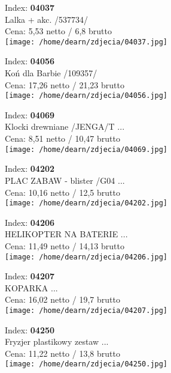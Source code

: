 {Index: \textbf{04037}\\
Lalka + akc.  /537734/\\
Cena: 5,53 netto / 6,8 brutto\\
  \texttt{[image: /home/dearn/zdjecia/04037.jpg]}}\newline\newline

{Index: \textbf{04056}\\
Koń dla Barbie /109357/\\
Cena: 17,26 netto / 21,23 brutto\\
  \texttt{[image: /home/dearn/zdjecia/04056.jpg]}}\newline\newline

{Index: \textbf{04069}\\
Klocki drewniane /JENGA/T ...\\
Cena: 8,51 netto / 10,47 brutto\\
  \texttt{[image: /home/dearn/zdjecia/04069.jpg]}}\newline\newline

{Index: \textbf{04202}\\
PLAC ZABAW - blister /G04 ...\\
Cena: 10,16 netto / 12,5 brutto\\
  \texttt{[image: /home/dearn/zdjecia/04202.jpg]}}\newline\newline

{Index: \textbf{04206}\\
HELIKOPTER NA BATERIE     ...\\
Cena: 11,49 netto / 14,13 brutto\\
  \texttt{[image: /home/dearn/zdjecia/04206.jpg]}}\newline\newline

{Index: \textbf{04207}\\
KOPARKA                   ...\\
Cena: 16,02 netto / 19,7 brutto\\
  \texttt{[image: /home/dearn/zdjecia/04207.jpg]}}\newline\newline

{Index: \textbf{04250}\\
Fryzjer plastikowy zestaw ...\\
Cena: 11,22 netto / 13,8 brutto\\
  \texttt{[image: /home/dearn/zdjecia/04250.jpg]}}\newline\newline

